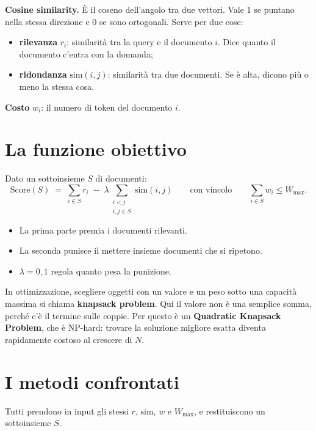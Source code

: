 \documentclass[11pt,a4paper]{article}
\begin{document}
\textbf{Cosine similarity.} È il coseno dell'angolo tra due vettori. Vale 1 se puntano nella stessa direzione e 0 se sono ortogonali. Serve per due cose:
\begin{itemize}
  \item \textbf{rilevanza} $r_i$: similarità tra la query e il documento $i$. Dice quanto il documento c'entra con la domanda;
  \item \textbf{ridondanza} $\mathrm{sim}(i,j)$: similarità tra due documenti. Se è alta, dicono più o meno la stessa cosa.
\end{itemize}

\textbf{Costo} $w_i$: il numero di token del documento $i$.

\section{La funzione obiettivo}

Dato un sottoinsieme $S$ di documenti:
\[
\mathrm{Score}(S) \;=\; \sum_{i \in S} r_i \;-\; \lambda \sum_{\substack{i<j \\ i,j \in S}} \mathrm{sim}(i,j)
\qquad\text{con vincolo}\qquad
\sum_{i \in S} w_i \le W_{\max}.
\]

\begin{itemize}
  \item La prima parte premia i documenti rilevanti.
  \item La seconda punisce il mettere insieme documenti che si ripetono.
  \item $\lambda = 0{,}1$ regola quanto pesa la punizione.
\end{itemize}

In ottimizzazione, scegliere oggetti con un valore e un peso sotto una capacità massima si chiama \textbf{knapsack problem}. Qui il valore non è una semplice somma, perché c'è il termine sulle coppie. Per questo è un \textbf{Quadratic Knapsack Problem}, che è NP-hard: trovare la soluzione migliore esatta diventa rapidamente costoso al crescere di $N$.

\section{I metodi confrontati}

Tutti prendono in input gli stessi $r$, $\mathrm{sim}$, $w$ e $W_{\max}$, e restituiscono un sottoinsieme $S$.
\end{document}
